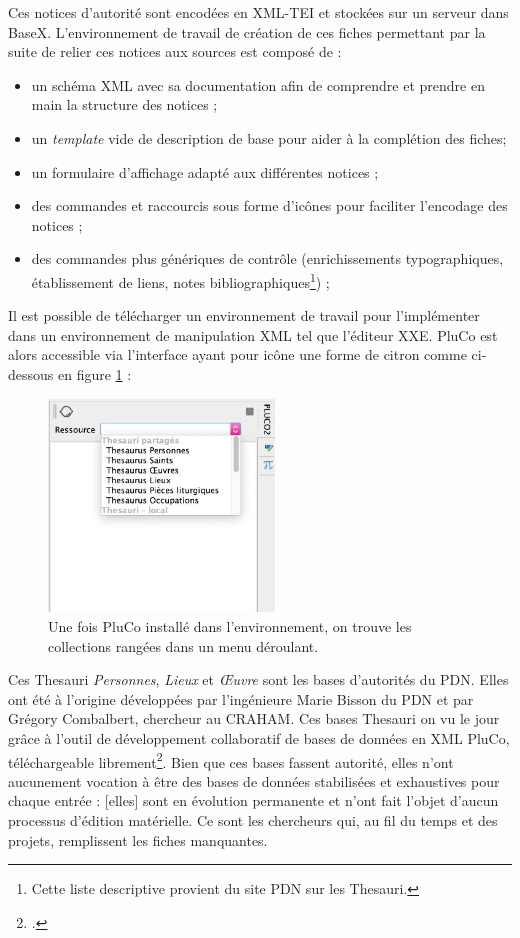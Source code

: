 \documentclass[a4paper,12pt,twoside]{book}
\begin{document}
Ces notices d'autorité sont encodées en XML-TEI et stockées sur un serveur dans BaseX. L'environnement de travail de création de ces fiches permettant par la suite de relier ces notices aux sources est composé de :
\begin{itemize}
    \item un schéma XML avec sa documentation afin de comprendre et prendre en main la structure des notices ;
    \item un \textit{template} vide de description de base pour aider à la complétion des fiches;
    \item un formulaire d'affichage adapté aux différentes notices ;
    \item des commandes et raccourcis sous forme d'icônes pour faciliter l'encodage des notices ;
    \item des commandes plus génériques de contrôle (enrichissements typographiques, établissement de liens, notes bibliographiques\footnote{Cette liste descriptive provient du site \acrshort{PDN} sur les Thesauri.}) ;
\end{itemize}

Il est possible de télécharger un environnement de travail pour l'implémenter dans un environnement de manipulation XML tel que l'éditeur \acrshort{XXE}. PluCo est alors accessible via l'interface ayant pour icône une forme de citron comme ci-dessous en figure \ref{citron} :

\begin{figure}[H]
    \centering
    \includegraphics[width=6cm]{img/partie_3/pluco.JPG}
    \caption{Une fois PluCo installé dans l'environnement, on trouve les collections rangées dans un menu déroulant.}
    \label{citron}
\end{figure}


Ces Thesauri \textit{Personnes}, \textit{Lieux} et \textit{\OE{}uvre} sont les bases d'autorités du \acrshort{PDN}. Elles ont été à l'origine développées par l'ingénieure Marie Bisson du \acrshort{PDN} et par Grégory Combalbert, chercheur au \acrshort{CRAHAM}. Ces bases Thesauri on vu le jour grâce à l'outil de développement collaboratif de bases de données en XML \acrshort{PluCo}, téléchargeable librement\footcite{pluco}. Bien que ces bases fassent autorité, elles n'ont aucunement vocation à être des \og bases de données stabilisées et exhaustives pour chaque entrée : [elles] sont en évolution permanente et n'ont fait l'objet d'aucun processus d'édition matérielle\fg. Ce sont les chercheurs qui, au fil du temps et des projets, remplissent les fiches manquantes.
\end{document}
